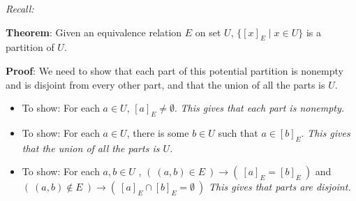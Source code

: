 
{\it Recall:} 




{\bf Theorem}: Given an equivalence relation $E$ on set $U$,  $\{ [x]_{E} \mid x \in U  \}$ is a partition of $U$.

{\bf Proof}: We need to show that each part of this potential partition is nonempty and is 
disjoint from every other part, and that the union of all the parts is $U$.

\begin{itemize}
\item To show: For each  $a \in U$, $[a]_{E}  \neq  \emptyset$.  {\it This gives that each part is nonempty.}

\vspace{200pt}

\item To show: For each $a \in U$, there is some $b \in U$  such that $a \in [b]_{E}$.
{\it This gives that the union of all the parts is $U$.}

\vspace{200pt}

\item To show: For each  $a,b  \in U$ , $(~(a,b)  \in  E ~)\to (~ [a]_{E}  = [b]_{E}~)$
and  $(~(a,b)  \notin  E ~)\to (~ [a]_{E} \cap[b]_{E} = \emptyset~)$
{\it This gives that parts are disjoint.}

\vspace{400pt}
\end{itemize}
